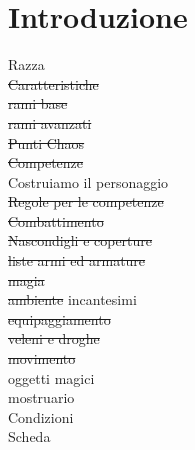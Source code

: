 \documentclass[12pt,a4paper,twoside,openany]{book}
\begin{document}








\section{Introduzione}
Razza\\
\sout{Caratteristiche}\\
\sout{rami base}\\
\sout{rami avanzati}\\
\sout{Punti Chaos}\\
\sout{Competenze}\\
Costruiamo il personaggio\\
\sout{Regole per le competenze}\\
\sout{Combattimento}\\
\sout{Nascondigli e coperture}\\
\sout{liste armi ed armature}\\
\sout{magia}\\
\sout{ambiente}
incantesimi\\
\sout{equipaggiamento}\\
\sout{veleni e droghe}\\
\sout{movimento}\\
oggetti magici\\
mostruario\\
Condizioni\\
Scheda\\
\end{document}
